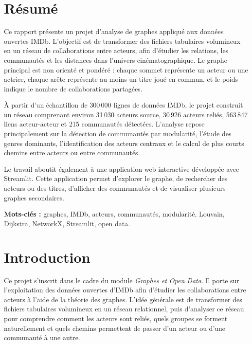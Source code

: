 \documentclass[a4paper,12pt]{article}
\begin{document}
\newpage
\section*{Résumé}

Ce rapport présente un projet d'analyse de graphes appliqué aux données ouvertes IMDb. L'objectif est de transformer des fichiers tabulaires volumineux en un réseau de collaborations entre acteurs, afin d'étudier les relations, les communautés et les distances dans l'univers cinématographique. Le graphe principal est non orienté et pondéré : chaque sommet représente un acteur ou une actrice, chaque arête représente au moins un titre joué en commun, et le poids indique le nombre de collaborations partagées.

À partir d'un échantillon de 300\,000 lignes de données IMDb, le projet construit un réseau comprenant environ 31\,030 acteurs source, 30\,926 acteurs reliés, 563\,847 liens acteur-acteur et 215 communautés détectées. L'analyse repose principalement sur la détection de communautés par modularité, l'étude des genres dominants, l'identification des acteurs centraux et le calcul de plus courts chemins entre acteurs ou entre communautés.

Le travail aboutit également à une application web interactive développée avec Streamlit. Cette application permet d'explorer le graphe, de rechercher des acteurs ou des titres, d'afficher des communautés et de visualiser plusieurs graphes secondaires.

\vspace{0.4cm}
\noindent\textbf{Mots-clés :} graphes, IMDb, acteurs, communautés, modularité, Louvain, Dijkstra, NetworkX, Streamlit, open data.

\newpage
\tableofcontents
\newpage

\section{Introduction}

Ce projet s'inscrit dans le cadre du module \textit{Graphes et Open Data}. Il porte sur l'exploitation des données ouvertes d'IMDb afin d'étudier les collaborations entre acteurs à l'aide de la théorie des graphes. L'idée générale est de transformer des fichiers tabulaires volumineux en un réseau relationnel, puis d'analyser ce réseau pour comprendre comment les acteurs sont reliés, quels groupes se forment naturellement et quels chemins permettent de passer d'un acteur ou d'une communauté à une autre.
\end{document}
